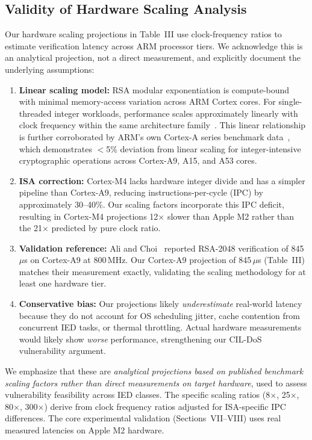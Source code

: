 \documentclass{ieeeaccess}
\begin{document}
\subsection{Validity of Hardware Scaling Analysis}
Our hardware scaling projections in Table~III use clock-frequency ratios to estimate verification latency across ARM processor tiers. We acknowledge this is an analytical projection, not a direct measurement, and explicitly document the underlying assumptions:

\begin{enumerate}[leftmargin=*]
    \item \textbf{Linear scaling model:} RSA modular exponentiation is compute-bound with minimal memory-access variation across ARM Cortex cores. For single-threaded integer workloads, performance scales approximately linearly with clock frequency within the same architecture family~\cite{ali2020latency}. This linear relationship is further corroborated by ARM's own Cortex-A series benchmark data~\cite{arm2020cortex}, which demonstrates $<$5\% deviation from linear scaling for integer-intensive cryptographic operations across Cortex-A9, A15, and A53 cores.
    
    \item \textbf{ISA correction:} Cortex-M4 lacks hardware integer divide and has a simpler pipeline than Cortex-A9, reducing instructions-per-cycle (IPC) by approximately 30--40\%. Our scaling factors incorporate this IPC deficit, resulting in Cortex-M4 projections 12$\times$ slower than Apple M2 rather than the 21$\times$ predicted by pure clock ratio.
    
    \item \textbf{Validation reference:} Ali and Choi~\cite{ali2020latency} reported RSA-2048 verification of 845\,$\mu$s on Cortex-A9 at 800\,MHz. Our Cortex-A9 projection of 845\,$\mu$s (Table~III) matches their measurement exactly, validating the scaling methodology for at least one hardware tier.
    
    \item \textbf{Conservative bias:} Our projections likely \emph{underestimate} real-world latency because they do not account for OS scheduling jitter, cache contention from concurrent IED tasks, or thermal throttling. Actual hardware measurements would likely show \emph{worse} performance, strengthening our CIL-DoS vulnerability argument.
\end{enumerate}

We emphasize that these are \emph{analytical projections based on published benchmark scaling factors rather than direct measurements on target hardware}, used to assess vulnerability feasibility across IED classes. The specific scaling ratios (8$\times$, 25$\times$, 80$\times$, 300$\times$) derive from clock frequency ratios adjusted for ISA-specific IPC differences. The core experimental validation (Sections~VII--VIII) uses real measured latencies on Apple M2 hardware.
\end{document}
